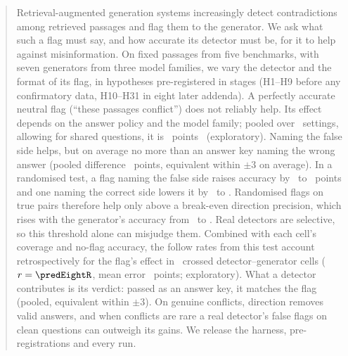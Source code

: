 \begin{abstract}
Retrieval-augmented generation systems increasingly detect contradictions among retrieved passages and flag them to
the generator. We ask what such a flag must say, and how accurate its detector must be, for it to help against
misinformation. On fixed passages from five benchmarks, with seven generators from three model families, we vary the
detector and the format of its flag, in hypotheses pre-registered in stages (H1--H9 before any confirmatory data,
H10--H31 in eight later addenda). A perfectly accurate neutral flag (``these passages conflict'') does not reliably
help. Its effect depends on the answer policy and the model family; pooled over \neuMlK\ settings, allowing
for shared questions, it is \neuMlMu\ points \neuMlCI\ (exploratory). Naming the false side helps, but on average no more than
an answer key naming the wrong answer (pooled difference \PoolTwentyThree\ points, equivalent within $\pm$3 on average). In a
randomised test, a flag naming the false side raises accuracy by \hThirtyOneAMin\ to \hThirtyOneAMax\ points and one naming the correct side lowers it by
\ahThirtyOneBMax\ to \ahThirtyOneBMin. Randomised flags on true pairs therefore help only above a break-even direction
precision, which rises with the generator's accuracy from \beMin\ to \beMax. Real detectors are selective, so this
threshold alone can misjudge them. Combined with each cell's coverage and no-flag accuracy, the follow rates from this
test account retrospectively for the flag's effect in \predEightN\ crossed detector--generator cells
($r=\predEightR$, mean error \predEightMae\ points; exploratory). What a
detector contributes is its verdict: passed as an answer key, it matches the flag (pooled, equivalent within $\pm$3). On genuine
conflicts, direction removes valid answers, and when conflicts are rare a real detector's false flags on clean
questions can outweigh its gains. We release the harness, pre-registrations and every run.
\end{abstract}
